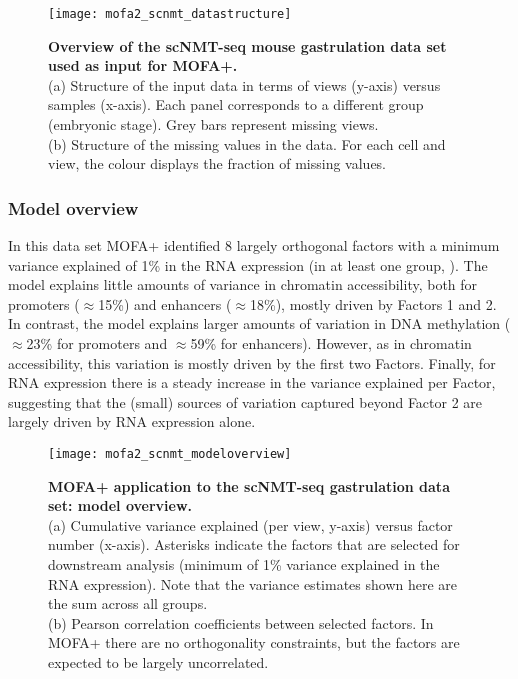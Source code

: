 \begin{figure}[H]
	\centering
	\texttt{[image: mofa2\_scnmt\_datastructure]}
	\caption[]{
	\textbf{Overview of the scNMT-seq mouse gastrulation data set used as input for MOFA+.}\\
	(a) Structure of the input data in terms of views (y-axis) versus samples (x-axis). Each panel corresponds to a different group (embryonic stage). Grey bars represent missing views. \\
	(b) Structure of the missing values in the data. For each cell and view, the colour displays the fraction of missing values.
	}
	\label{fig:mofa2_scnmt_datastructure}
\end{figure}

\subsubsection{Model overview}

In this data set MOFA+ identified 8 largely orthogonal factors with a minimum variance explained of 1\% in the RNA expression (in at least one group, ). The model explains little amounts of variance in chromatin accessibility, both for promoters ($\approx$15\%) and enhancers ($\approx$18\%), mostly driven by Factors 1 and 2. In contrast, the model explains larger amounts of variation in DNA methylation ($\approx$23\% for promoters and $\approx$59\% for enhancers). However, as in chromatin accessibility, this variation is mostly driven by the first two Factors. Finally, for RNA expression there is a steady increase in the variance explained per Factor, suggesting that the (small) sources of variation captured beyond Factor 2 are largely driven by RNA expression alone.

\begin{figure}[H]
	\centering
	\texttt{[image: mofa2\_scnmt\_modeloverview]}
	\caption[]{
	\textbf{MOFA+ application to the scNMT-seq gastrulation data set: model overview.} \\
	(a) Cumulative variance explained (per view, y-axis) versus factor number (x-axis). Asterisks indicate the factors that are selected for downstream analysis (minimum of 1\% variance explained in the RNA expression). Note that the variance estimates shown here are the sum across all groups. \\
	(b) Pearson correlation coefficients between selected factors. In MOFA+ there are no orthogonality constraints, but the factors are expected to be largely uncorrelated.
	}
	\label{fig:mofa2_scnmt_modeloverview}
\end{figure}


